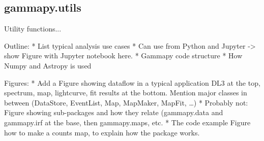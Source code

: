 \subsection{gammapy.utils}
\label{ssec:gammapy-utils}
Utility functions...

Outline: * List typical analysis use cases * Can use from Python and Jupyter ->
show Figure with Jupyter notebook here. * Gammapy code structure * How Numpy
and Astropy is used

Figures: * Add a Figure showing dataflow in a typical application DL3 at the
top, spectrum, map, lightcurve, fit results at the bottom. Mention major
classes in between (DataStore, EventList, Map, MapMaker, MapFit, …) * Probably
not: Figure showing sub-packages and how they relate (gammapy.data and
gammapy.irf at the base, then gammapy.maps, etc. * The code example Figure how
to make a counts map, to explain how the package works.
